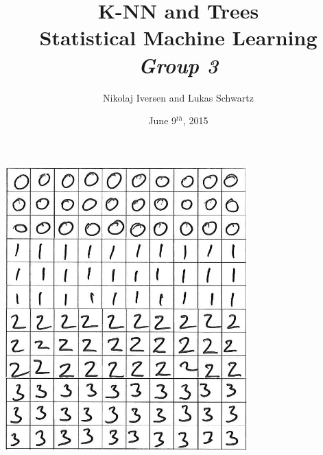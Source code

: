 \documentclass[11pt,a4paper, twoside]{article}
\begin{document}
\raggedbottom

\title{K-NN and Trees\\Statistical Machine Learning\\{\large\emph{Group 3}}}
\author{Nikolaj Iversen and Lukas Schwartz}
\date{June 9$^{th}$, 2015}
\maketitle

\vfill
\begin{center}
\includegraphics[width=0.7\textwidth]{graphics/digit_example}
\end{center}

\newpage

\ 
\newpage
\addtolength{\evensidemargin}{-0.7cm}
\addtolength{\oddsidemargin}{0.7cm}




\newpage
{}
\setcounter{page}{1}
\addtolength{\evensidemargin}{1.4cm}
\addtolength{\oddsidemargin}{-1.4cm}
\pagestyle{fancy}
\renewcommand{\footrulewidth}{0.4pt}
\renewcommand{\sectionmark}[1]{ \markright{#1}{} }
\fancyhf{}
\lfoot{\sectionmark}
\cfoot{}
\fancyhead[RE,LO]{\textit{ \nouppercase{\rightmark}} }



\setcounter{tocdepth}{2}
\tableofcontents
\pagebreak
\listoffigures
\end{document}
